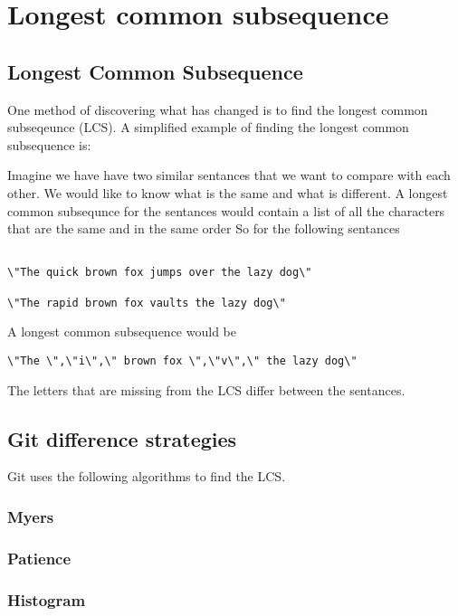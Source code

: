 \chapter{Longest common subsequence}

\section{Longest Common Subsequence}
One method of discovering what has changed is to find the longest common subseqeunce (LCS).
A simplified example of finding the longest common subsequence is:

Imagine we have have two similar sentances that we want to compare with each other.  
We would like to know what is the same and what is different.
A longest common subsequnce for the sentances would contain a list of all the characters that are the same and in the same order
So for the following sentances

\begin{verbatim}

\"The quick brown fox jumps over the lazy dog\"

\"The rapid brown fox vaults the lazy dog\"

\end{verbatim}
A longest common subsequence would be
\begin{verbatim}
\"The \",\"i\",\" brown fox \",\"v\",\" the lazy dog\"
\end{verbatim}
The letters that are missing from the LCS differ between the sentances.

\section{Git difference strategies}
Git uses the following algorithms to find the LCS.

\subsection{Myers}


\subsection{Patience}


\subsection{Histogram}

